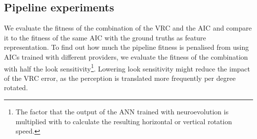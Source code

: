 \subsection{Pipeline experiments}
We evaluate the fitness of the combination of the VRC and the AIC and compare it to the fitness of the same AIC with the ground truths as feature representation. To find out how much the pipeline fitness is penalised from using AICs trained with different providers, we evaluate the fitness of the combination with half the look sensitivity\footnote{The factor that the output of the ANN trained with neuroevolution is multiplied with to calculate the resulting horizontal or vertical rotation speed.}. Lowering look sensitivity might reduce the impact of the VRC error, as the perception is translated more frequently per degree rotated. 






